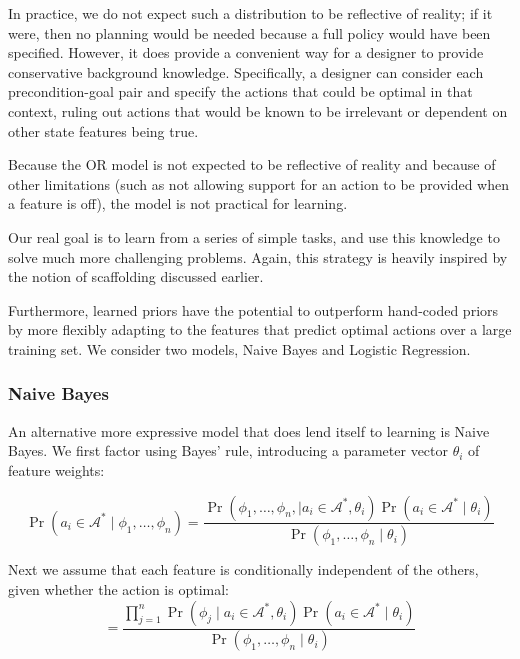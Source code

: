 \documentclass[11pt]{article}
\begin{document}
In practice, we do not expect such a distribution to be reflective of
reality; if it were, then no planning would be needed because a full
policy would have been specified. However, it does provide a
convenient way for a designer to provide conservative background
knowledge. Specifically, a designer can consider each precondition-goal
pair and specify the actions that could be optimal in that context, ruling
out actions that would be known to be irrelevant or dependent on other
state features being true.

Because the OR model is not expected to be reflective of
reality and because of other limitations (such as not allowing support
for an action to be provided when a feature is off), the model is not
practical for learning.

Our real goal is to learn from a series of simple tasks, and use this knowledge to solve much more challenging problems. Again, this strategy is heavily inspired by the notion of scaffolding discussed earlier.

Furthermore, learned priors have the potential to outperform
hand-coded priors by more flexibly adapting to the
features that predict optimal actions over a large training set.
We consider two models, Naive Bayes and Logistic Regression.

\subsubsection{Naive Bayes}
An alternative more expressive model that does lend itself to learning is
Naive Bayes. We first factor using Bayes' rule, introducing a parameter vector $\theta_i$ of
feature weights:

\begin{equation}
\Pr(a_i \in \mathcal{A}^*  \mid \phi_1, \ldots, \phi_n) = \frac{\Pr(\phi_1, \ldots, \phi_{n}, \mid a_i \in \mathcal{A}^*, \theta_i) \Pr(a_i \in \mathcal{A}^* \mid \theta_i)}{\Pr(\phi_1, \ldots, \phi_{n} \mid \theta_i)}
\label{eq:bayes}
\end{equation}

Next we assume that each feature is conditionally independent of the others, given whether the action is optimal:
\begin{equation}
= \frac{\prod_{j=1}^{n} \Pr(\phi_j \mid a_i \in \mathcal{A}^*, \theta_i) \Pr(a_i \in \mathcal{A}^* \mid \theta_i) }{\Pr(\phi_1, \ldots, \phi_{n} \mid \theta_i)}
\label{eq:final}
\end{equation}
\end{document}
